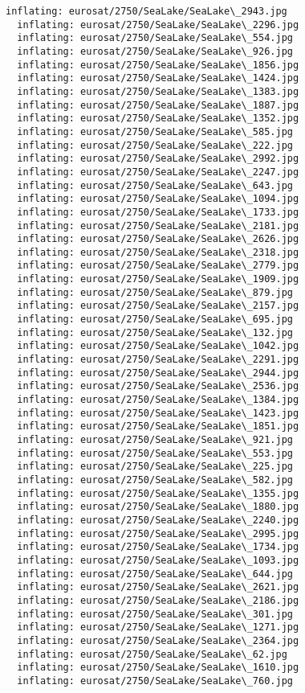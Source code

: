 \documentclass[11pt]{article}
\begin{document}
\begin{Verbatim}[commandchars=\\\{\}]
  inflating: eurosat/2750/SeaLake/SeaLake\_2943.jpg
  inflating: eurosat/2750/SeaLake/SeaLake\_2296.jpg
  inflating: eurosat/2750/SeaLake/SeaLake\_554.jpg
  inflating: eurosat/2750/SeaLake/SeaLake\_926.jpg
  inflating: eurosat/2750/SeaLake/SeaLake\_1856.jpg
  inflating: eurosat/2750/SeaLake/SeaLake\_1424.jpg
  inflating: eurosat/2750/SeaLake/SeaLake\_1383.jpg
  inflating: eurosat/2750/SeaLake/SeaLake\_1887.jpg
  inflating: eurosat/2750/SeaLake/SeaLake\_1352.jpg
  inflating: eurosat/2750/SeaLake/SeaLake\_585.jpg
  inflating: eurosat/2750/SeaLake/SeaLake\_222.jpg
  inflating: eurosat/2750/SeaLake/SeaLake\_2992.jpg
  inflating: eurosat/2750/SeaLake/SeaLake\_2247.jpg
  inflating: eurosat/2750/SeaLake/SeaLake\_643.jpg
  inflating: eurosat/2750/SeaLake/SeaLake\_1094.jpg
  inflating: eurosat/2750/SeaLake/SeaLake\_1733.jpg
  inflating: eurosat/2750/SeaLake/SeaLake\_2181.jpg
  inflating: eurosat/2750/SeaLake/SeaLake\_2626.jpg
  inflating: eurosat/2750/SeaLake/SeaLake\_2318.jpg
  inflating: eurosat/2750/SeaLake/SeaLake\_2779.jpg
  inflating: eurosat/2750/SeaLake/SeaLake\_1909.jpg
  inflating: eurosat/2750/SeaLake/SeaLake\_879.jpg
  inflating: eurosat/2750/SeaLake/SeaLake\_2157.jpg
  inflating: eurosat/2750/SeaLake/SeaLake\_695.jpg
  inflating: eurosat/2750/SeaLake/SeaLake\_132.jpg
  inflating: eurosat/2750/SeaLake/SeaLake\_1042.jpg
  inflating: eurosat/2750/SeaLake/SeaLake\_2291.jpg
  inflating: eurosat/2750/SeaLake/SeaLake\_2944.jpg
  inflating: eurosat/2750/SeaLake/SeaLake\_2536.jpg
  inflating: eurosat/2750/SeaLake/SeaLake\_1384.jpg
  inflating: eurosat/2750/SeaLake/SeaLake\_1423.jpg
  inflating: eurosat/2750/SeaLake/SeaLake\_1851.jpg
  inflating: eurosat/2750/SeaLake/SeaLake\_921.jpg
  inflating: eurosat/2750/SeaLake/SeaLake\_553.jpg
  inflating: eurosat/2750/SeaLake/SeaLake\_225.jpg
  inflating: eurosat/2750/SeaLake/SeaLake\_582.jpg
  inflating: eurosat/2750/SeaLake/SeaLake\_1355.jpg
  inflating: eurosat/2750/SeaLake/SeaLake\_1880.jpg
  inflating: eurosat/2750/SeaLake/SeaLake\_2240.jpg
  inflating: eurosat/2750/SeaLake/SeaLake\_2995.jpg
  inflating: eurosat/2750/SeaLake/SeaLake\_1734.jpg
  inflating: eurosat/2750/SeaLake/SeaLake\_1093.jpg
  inflating: eurosat/2750/SeaLake/SeaLake\_644.jpg
  inflating: eurosat/2750/SeaLake/SeaLake\_2621.jpg
  inflating: eurosat/2750/SeaLake/SeaLake\_2186.jpg
  inflating: eurosat/2750/SeaLake/SeaLake\_301.jpg
  inflating: eurosat/2750/SeaLake/SeaLake\_1271.jpg
  inflating: eurosat/2750/SeaLake/SeaLake\_2364.jpg
  inflating: eurosat/2750/SeaLake/SeaLake\_62.jpg
  inflating: eurosat/2750/SeaLake/SeaLake\_1610.jpg
  inflating: eurosat/2750/SeaLake/SeaLake\_760.jpg

\end{Verbatim}
\end{document}
